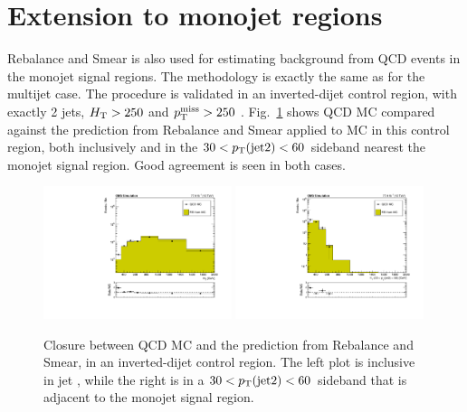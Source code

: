 \section{Extension to monojet regions}

Rebalance and Smear is also used for estimating background from QCD events in the monojet signal regions.
The methodology is exactly the same as for the multijet case. The procedure is validated in an inverted-\dpmin dijet
control region, with exactly 2 jets, $H_{\mathrm{T}}>250$ \GeV and $p_{\mathrm{T}}^{\mathrm{miss}}>250$ \GeV. Fig.~\ref{Fig:rs_monojet_mc_validation} shows QCD MC
compared against the prediction from Rebalance and Smear applied to MC in this control region,
both inclusively and in the $30 < p_{\mathrm{T}}(\mathrm{jet 2}) < 60$ \GeV
sideband nearest the monojet signal region. Good agreement is seen in both cases.

\begin{figure}[htp!]
  \begin{center}
    \includegraphics[width=0.49\textwidth]{figs/qcd/rs_data/monojet/mc_crRSInvertDPhibaseJ_htbins.pdf}
    \includegraphics[width=0.49\textwidth]{figs/qcd/rs_data/monojet/mc_crRSInvertDPhibaseJ_htbins_jet2pt_30_60.pdf}
    \caption{Closure between QCD MC and the prediction from Rebalance and Smear, in an inverted-\dpmin dijet
control region. The left plot is inclusive in jet \pt, while the right is in a $30 < p_{\mathrm{T}}(\mathrm{jet 2}) < 60$ \GeV
sideband that is adjacent to the monojet signal region.
            }
    \label{Fig:rs_monojet_mc_validation}
  \end{center}
\end{figure}

